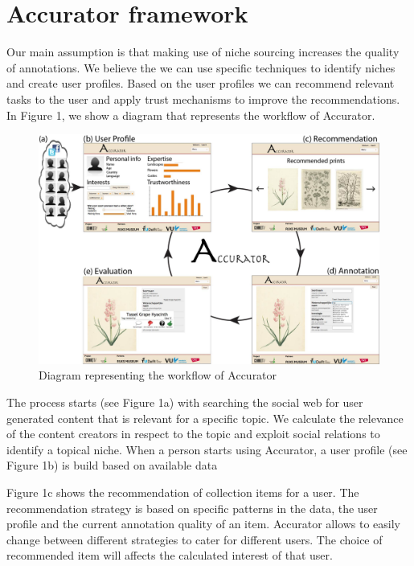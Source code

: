 \section{Accurator framework}
\label{architecture}
Our main assumption is that making use of niche sourcing increases the quality of annotations. We believe the we can use specific techniques to identify niches and create user profiles. Based on the user profiles we can recommend relevant tasks to the user and apply trust mechanisms to improve the recommendations. In Figure 1, we show a diagram that represents the workflow of Accurator. 

\begin{figure}[hbt]
	\centering
	\includegraphics[width=\textwidth]{accurator_diagram.jpg}
  	\caption{Diagram representing the workflow of Accurator}
\end{figure}

The process starts (see Figure 1a) with searching the social web for user generated content that is relevant for a specific topic. We calculate the relevance of the content creators in respect to the topic and exploit social relations to identify a topical niche. When a person starts using Accurator, a user profile (see Figure 1b) is build based on available data

Figure 1c shows the recommendation of collection items for a user. The recommendation strategy is based on specific patterns in the data, the user profile and the current annotation quality of an item. Accurator allows to easily change between different strategies to cater for different users.
The choice of recommended item will affects the calculated interest of that user.

